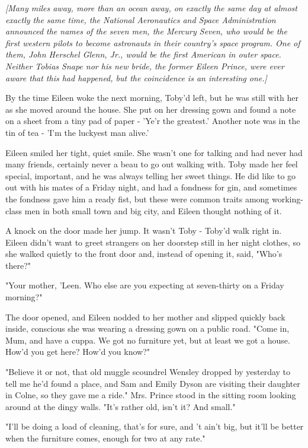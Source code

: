 \documentclass[a4paper,11pt]{article}
\begin{document}
\emph{[Many miles away, more than an ocean away, on exactly the same day at almost exactly the same time, the National Aeronautics and Space Administration announced the names of the seven men, the Mercury Seven, who would be the first western pilots to become astronauts in their country's space program. One of them, John Herschel Glenn, Jr., would be the first American in outer space. Neither Tobias Snape nor his new bride, the former Eileen Prince, were ever aware that this had happened, but the coincidence is an interesting one.]}

By the time Eileen woke the next morning, Toby'd left, but he was still with her as she moved around the house. She put on her dressing gown and found a note on a sheet from a tiny pad of paper - 'Ye'r the greatest.' Another note was in the tin of tea - 'I'm the luckyest man alive.'

Eileen smiled her tight, quiet smile. She wasn't one for talking and had never had many friends, certainly never a beau to go out walking with. Toby made her feel special, important, and he was always telling her sweet things. He did like to go out with his mates of a Friday night, and had a fondness for gin, and sometimes the fondness gave him a ready fist, but these were common traits among working-class men in both small town and big city, and Eileen thought nothing of it.

A knock on the door made her jump. It wasn't Toby - Toby'd walk right in. Eileen didn't want to greet strangers on her doorstep still in her night clothes, so she walked quietly to the front door and, instead of opening it, said, "Who's there?"

"Your mother, 'Leen. Who else are you expecting at seven-thirty on a Friday morning?"

The door opened, and Eileen nodded to her mother and slipped quickly back inside, conscious she was wearing a dressing gown on a public road. "Come in, Mum, and have a cuppa. We got no furniture yet, but at least we got a house. How'd you get here? How'd you know?"

"Believe it or not, that old muggle scoundrel Wensley dropped by yesterday to tell me he'd found a place, and Sam and Emily Dyson are visiting their daughter in Colne, so they gave me a ride." Mrs. Prince stood in the sitting room looking around at the dingy walls. "It's rather old, isn't it? And small."

"I'll be doing a load of cleaning, that's for sure, and 't ain't big, but it'll be better when the furniture comes, enough for two at any rate."
\end{document}
